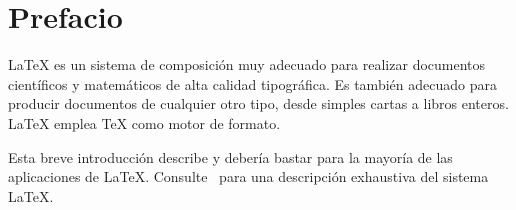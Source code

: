 

\chapter{Prefacio}

\LaTeX{} \cite{manual} es un sistema de composición muy adecuado para realizar documentos científicos y matemáticos de alta calidad tipográfica.  Es también adecuado para producir documentos de cualquier otro tipo, desde simples cartas a libros enteros.  \LaTeX{} emplea \TeX{} \cite{texbook} como motor de formato.

Esta breve introducción describe \LaTeXe{} y debería bastar para la mayoría de las aplicaciones de \LaTeX. Consulte~\cite{manual,companion} para una descripción exhaustiva del sistema \LaTeX{}.

